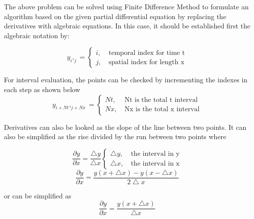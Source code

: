 \documentclass[conference]{IEEEtran}
\begin{document}
	The above problem can be solved using Finite Difference Method to formulate an algorithm based on the given partial differential equation by replacing the derivatives with algebraic equations. In this case, it should be established first the algebraic notation by:
	
	\begin{equation}
		\label{eqn: Notation1}
		y_{i},_{j} = 
		\begin{cases}
			i,&\ \text{temporal index for time t} \\
			j,&\ \text{spatial index for length x}
		\end{cases}
	\end{equation}

	For interval evaluation, the points can be checked by incrementing the indexes in each step as shown below
	\begin{equation}
		\label{eqn: Notation2}
		y_{i + Nt},_{j + Nx} = 
		\begin{cases}
			Nt,&\ \text{Nt is the total t interval} \\
			Nx,&\ \text{Nx is the total x interval}
		\end{cases}
	\end{equation}

	Derivatives can also be looked as the slope of the line between two points. It can also be simplified as the rise divided by the run between two points where
	
	\begin{equation}
		\label{eqn: Derivative}
		\frac{\partial y}{\partial x} = \frac{\bigtriangleup y}{\bigtriangleup x}
		\begin{cases}
			\bigtriangleup y,&\ \text{the interval in y} \\
			\bigtriangleup x,&\ \text{the interval in x}
		\end{cases}
	\end{equation}
	\begin{equation}
		\label{eqn: Derivative2}
		\frac{\partial y}{\partial x} = \frac{y(x + \bigtriangleup x) - y(x - \bigtriangleup x)}{2\bigtriangleup x}
	\end{equation}
	
	or can be simplified as 
	\begin{equation}
		\label{eqn: Derivative3}
		\frac{\partial y}{\partial x} = \frac{y(x + \bigtriangleup x)}{\bigtriangleup x}
	\end{equation}
	
\end{document}
